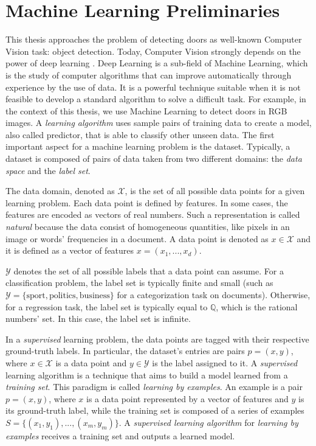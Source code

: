 \section{Machine Learning Preliminaries}
\label{sec:machine_learning}

This thesis approaches the problem of detecting doors as well-known Computer Vision task: object detection. Today, Computer Vision strongly depends on the power of deep learning \cite{deeplearningoverview}.
Deep Learning is a sub-field of Machine Learning, which is the study of computer algorithms that can improve automatically through experience by the use of data.  It is a powerful technique suitable when it is not feasible to develop a standard algorithm to solve a difficult task. For example, in the context of this thesis, we use Machine Learning to detect doors in RGB images. A \textit{learning algorithm} uses sample pairs of training data to create a model, also called predictor, that is able to classify other unseen data. The first important aspect for a machine learning problem is the dataset. Typically, a dataset is composed of pairs of data taken from two different domains: the \textit{data space} and the \textit{label set}.

\begin{definition}
	The data domain, denoted as $\mathcal{X}$, is the set of all possible data points for a given learning problem. Each data point is defined by features. In some cases, the features are encoded as vectors of real numbers. Such a representation is called \textit{natural} because the data consist of homogeneous quantities, like pixels in an image or words' frequencies in a document. A data point is denoted as $x \in \mathcal{X}$ and it is defined as a vector of features $x = (x_1, ..., x_d)$.
\end{definition}

\begin{definition}
	$\mathcal{Y}$ denotes the set of all possible labels that a data point can assume. For a classification problem, the label set is typically finite and small (such as $\mathcal{Y} = \{\text{sport}, \text{politics}, \text{business}\}$ for a categorization task on documents). Otherwise, for a regression task, the label set is typically equal to $\mathbb{Q}$, which is the rational numbers' set. In this case, the label set is infinite.
\end{definition}

In a \textit{supervised} learning problem, the data points are tagged with their respective ground-truth labels. In particular, the dataset's entries are pairs $p = (x, y)$, where $x \in \mathcal{X}$ is a data point and $y \in \mathcal{Y}$ is the label assigned to it. A \textit{supervised} learning algorithm is a technique that aims to build a model learned from a \textit{training set}. This paradigm is called \textit{learning by examples}. An example is a pair $p=(x, y)$, where $x$ is a data point represented by a vector of features and $y$ is its ground-truth label, while the training set is composed of a series of examples $S=\{(x_1, y_1), ..., (x_m, y_m)\}$. A \textit{supervised learning algorithm} for \textit{learning by examples} receives a training set and outputs a learned model.

